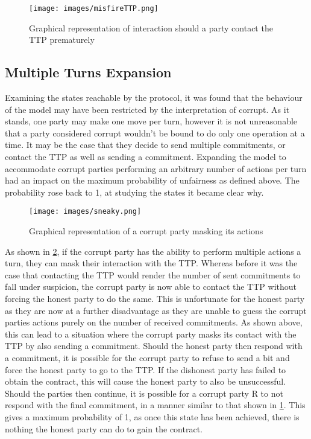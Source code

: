 \documentclass{l4proj}
\begin{document}
\begin{figure}[ht!]
\centering
\texttt{[image: images/misfireTTP.png]}
\caption{Graphical representation of interaction should a party contact the TTP prematurely}
\label{misfireTTP}
\end{figure}

\subsection{Multiple Turns Expansion}

Examining the states reachable by the protocol, it was found that the behaviour of the model may have been restricted by the interpretation of corrupt. As it stands, one party may make one move per turn, however it is not unreasonable that a party considered corrupt wouldn't be bound to do only one operation at a time. It may be the case that they decide to send multiple commitments, or contact the TTP as well as sending a commitment. Expanding the model to accommodate corrupt parties performing an arbitrary number of actions per turn had an impact on the maximum probability of unfairness as defined above. The probability rose back to 1, at studying the states it became clear why.

\begin{figure}[ht!]
\centering
\texttt{[image: images/sneaky.png]}
\caption{Graphical representation of a corrupt party masking its actions}
\label{sneak}
\end{figure}

As shown in \ref{sneak}, if the corrupt party has the ability to perform multiple actions a turn, they can mask their interaction with the TTP. Whereas before it was the case that contacting the TTP would render the number of sent commitments to fall under suspicion, the corrupt party is now able to contact the TTP without forcing the honest party to do the same. This is unfortunate for the honest party as they are now at a further disadvantage as they are unable to guess the corrupt parties actions purely on the number of received commitments. As shown above, this can lead to a situation where the corrupt party masks its contact with the TTP by also sending a commitment. Should the honest party then respond with a commitment, it is possible for the corrupt party to refuse to send a bit and force the honest party to go to the TTP. If the dishonest party has failed to obtain the contract, this will cause the honest party to also be unsuccessful. Should the parties then continue, it is possible for a corrupt party R to not respond with the final commitment, in a manner similar to that shown in \ref{misfireTTP}. This gives a maximum probability of 1, as once this state has been achieved, there is nothing the honest party can do to gain the contract. 
\end{document}
